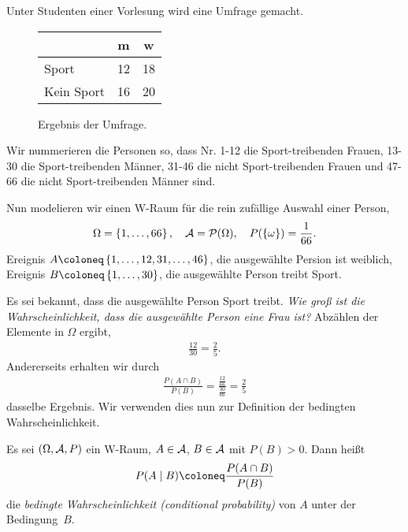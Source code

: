 \begin{bsp}
Unter Studenten einer Vorlesung wird eine Umfrage gemacht.
\begin{figure}[H]
\begin{tabular}{l|c|c}
 & m & w\\\hline
 Sport & 12 & 18\\
 Kein Sport & 16 & 20
\end{tabular}
\caption{Ergebnis der Umfrage.}
\end{figure}
Wir nummerieren die Personen so, dass Nr. 1-12 die Sport-treibenden Frauen, 
13-30 die Sport-treibenden Männer, 31-46 die nicht Sport-treibenden Frauen und
47-66 die nicht Sport-treibenden Männer sind.

Nun modelieren wir einen W-Raum für die rein zufällige Auswahl einer Person,
\begin{align*}
\Omega = \setd{1,\ldots,66},\quad \AA = \PP(\Omega),\quad P(\setd{\omega}) =
\frac{1}{66}.
\end{align*}
Ereignis $A\defl\setd{1,\ldots,12,31,\ldots,46}$, die ausgewählte Persion ist
weiblich,\\
Ereignis $B\defl\setd{1,\ldots,30}$, die ausgewählte Person treibt Sport.

Es sei bekannt, dass die ausgewählte Person Sport treibt. 
\textit{Wie groß ist die Wahrscheinlichkeit, dass die ausgewählte Person eine
Frau ist?} Abzählen der Elemente in $\Omega$ ergibt,
\begin{align*}
\frac{12}{30} = \frac{2}{5}. 
\end{align*}
Andererseits erhalten wir durch
\begin{align*}
\frac{P(A\cap B)}{P(B)} = \frac{\frac{12}{66}}{\frac{30}{66}} = \frac{2}{5}
\end{align*}
dasselbe Ergebnis. Wir verwenden dies nun zur Definition der bedingten
Wahrscheinlichkeit.\bsphere
\end{bsp}

\begin{defn}
\label{defn:1.10}
Es sei $(\Omega, \AA, P)$ ein W-Raum, $A \in {\cal
A}$, $B \in \AA$ mit $P(B) >0$.
Dann heißt
\begin{align*}
P(A\mid B)\defl \frac{P(A\cap B)}{P(B)}
\end{align*}
die \emph{bedingte Wahrscheinlichkeit (conditional probability)} von $A$ unter
der Bedingung~$B$.\fishhere
\end{defn}

